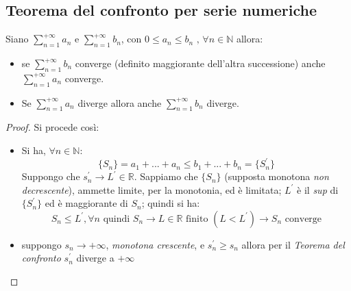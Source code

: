 \documentclass[a4paper,12pt, oneside]{book}
\begin{document}
\subsection{Teorema del confronto per serie numeriche}
\begin{teorema} Siano $\sum_{n=1}^{+\infty}
  a_n$ e $\sum_{n=1}^{+\infty} b_n$, con $0\leq a_n\leq b_n \mbox{ , } \forall
  n\in \mathbb{N}$ allora:
  \begin{itemize}
    \item se $\sum_{n=1}^{+\infty} b_n$ converge (definito maggiorante
    dell'altra successione) anche $\sum_{n=1}^{+\infty} a_n$ converge.
    \item Se $\sum_{n=1}^{+\infty} a_n$ diverge allora anche
    $\sum_{n=1}^{+\infty} b_n$ diverge.
  \end{itemize}
\end{teorema}
\begin{proof} Si procede così:
  \begin{itemize}
    \item Si ha, $\forall n\in \mathbb{N}$:
    $$\{S_n\}=a_1+...+a_n\leq b_1+...+b_n=\{S^{'}_n\}$$
    Suppongo che $s^{'}_n\rightarrow L^{'} \in \mathbb{R}$. Sappiamo che
    $\{S_n\}$ (supposta monotona \textit{non decrescente}), ammette limite, per la
    monotonia, ed è limitata; $L^{'}$ è il \textit{sup} di $\{S^{'}_n\}$ ed è
    maggiorante di $S_n$; quindi si ha:
    $$S_n\leq L^{'}, \forall n\mbox{  quindi  } S_n\rightarrow L\in \mathbb{R}\mbox{  finito  } (L<L^{'}) \longrightarrow S_n \mbox{ converge}$$
    \item suppongo $s_n\rightarrow +\infty$, \textit{monotona crescente}, e
    $s^{'}_n\geq s_n$ allora per il \textit{Teorema del confronto} $s^{'}_n$ diverge
    a $+\infty$
  \end{itemize}
\end{proof}
\end{document}
